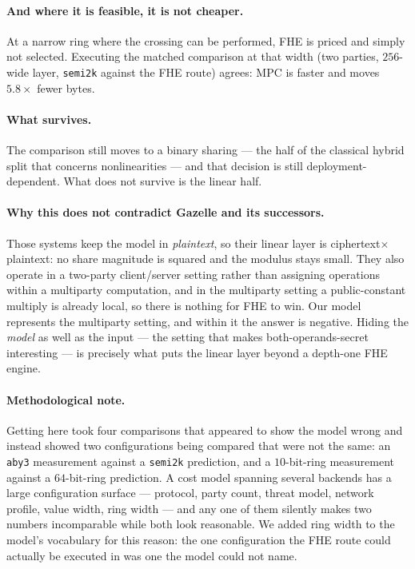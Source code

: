 \documentclass[11pt]{article}
\newcommand{\bt}[1]{\texttt{#1}}
\begin{document}
\paragraph{And where it is feasible, it is not cheaper.} At a narrow ring
where the crossing can be performed, FHE is priced and simply not selected.
Executing the matched comparison at that width (two parties, $256$-wide layer,
\bt{semi2k} against the FHE route) agrees: MPC is faster and moves
$5.8\times$ fewer bytes.

\paragraph{What survives.} The comparison still moves to a binary sharing ---
the half of the classical hybrid split that concerns nonlinearities --- and
that decision is still deployment-dependent. What does not survive is the
linear half.

\paragraph{Why this does not contradict Gazelle and its successors.} Those
systems keep the model in \emph{plaintext}, so their linear layer is
ciphertext$\times$plaintext: no share magnitude is squared and the modulus
stays small. They also operate in a two-party client/server setting rather
than assigning operations within a multiparty computation, and in the
multiparty setting a public-constant multiply is already local, so there is
nothing for FHE to win. Our model represents the multiparty setting, and
within it the answer is negative. Hiding the \emph{model} as well as the input
--- the setting that makes both-operands-secret interesting --- is precisely what
puts the linear layer beyond a depth-one FHE engine.

\paragraph{Methodological note.} Getting here took four comparisons that
appeared to show the model wrong and instead showed two configurations being
compared that were not the same: an \bt{aby3} measurement against a
\bt{semi2k} prediction, and a $10$-bit-ring measurement against a $64$-bit-ring
prediction. A cost model spanning several backends has a large configuration
surface --- protocol, party count, threat model, network profile, value width,
ring width --- and any one of them silently makes two numbers incomparable while
both look reasonable. We added ring width to the model's vocabulary for this
reason: the one configuration the FHE route could actually be executed in was
one the model could not name.
\end{document}
